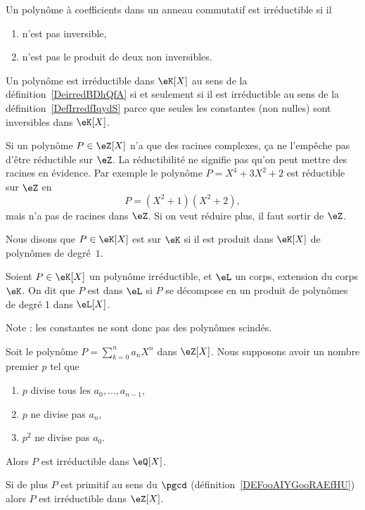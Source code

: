 \begin{definition}      \label{DefIrredfIqydS}
	Un polynôme à coefficients dans un anneau commutatif est irréductible si il
	\begin{enumerate}
		\item
		      n'est pas inversible,
		\item
		      n'est pas le produit de deux non inversibles.
	\end{enumerate}
\end{definition}

Un polynôme est irréductible dans \( \eK[X]\) au sens de la définition~\ref{DeirredBDhQfA} si et seulement si il est irréductible au sens de la définition~\ref{DefIrredfIqydS} parce que seules les constantes (non nulles) sont inversibles dans \( \eK[X]\).

\begin{example}
	Si un polynôme \( P\in \eZ[X]\) n'a que des racines complexes, ça ne l'empêche pas d'être réductible sur \( \eZ\). La réductibilité ne signifie pas qu'on peut mettre des racines en évidence. Par exemple le polynôme \( P=X^4+3X^2+2\) est réductible sur \( \eZ\) en
	\begin{equation}
		P=(X^2+1)(X^2+2),
	\end{equation}
	mais n'a pas de racines dans \( \eZ\). Si on veut réduire plus, il faut sortir de \( \eZ\).

\end{example}

\begin{definition}  \label{DefCPLSooQaHJKQ}\label{DefPolynomeScinde}
	Nous disons que \( P\in\eK[X]\) est  sur \(\eK\) si il est produit dans \(\eK[X]\) de polynômes de degré~\( 1\).

	Soient \( P\in\eK[X]\) un polynôme irréductible, et \( \eL\) un corps, extension du corps \( \eK\). On dit que \( P \) est  dans \( \eL \) si \( P \) se décompose en un produit de polynômes de degré 1 dans \( \eL[X]\).
\end{definition}
Note : les constantes ne sont donc pas des polynômes scindés.

\begin{proposition}
	Soit le polynôme \( P=\sum_{k=0}^n a_nX^n\) dans \( \eZ[X]\). Nous supposons avoir un nombre premier \( p\) tel que
	\begin{enumerate}
		\item
		      \( p\) divise tous les \( a_0,\ldots, a_{n-1}\),
		\item
		      \( p\) ne divise pas \( a_n\),
		\item
		      \( p^2\) ne divise pas \( a_0\).
	\end{enumerate}
	Alors \( P\) est irréductible dans \( \eQ[X]\).

	Si de plus \( P\) est primitif au sens du \( \pgcd\) (définition~\ref{DEFooAIYGooRAEfHU}) alors \( P\) est irréductible dans \( \eZ[X]\).
\end{proposition}

